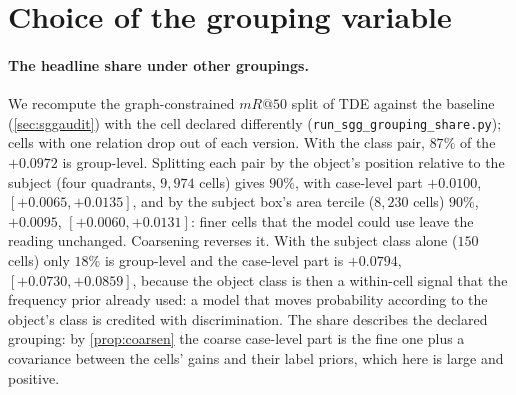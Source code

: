 \section{Choice of the grouping variable}\label{app:partition}

\paragraph{The headline share under other groupings.} We recompute the graph-constrained
$mR@50$ split of TDE against the baseline (\cref{sec:sggaudit}) with the cell declared
differently (\texttt{run\_sgg\_grouping\_share.py}); cells with one relation drop out of each
version. With the class pair, $87\%$ of the $+0.0972$ is group-level. Splitting each pair by the
object's position relative to the subject (four quadrants, $9{,}974$ cells) gives $90\%$, with
case-level part $+0.0100$, $[+0.0065,+0.0135]$, and by the subject box's area tercile
($8{,}230$ cells) $90\%$, $+0.0095$, $[+0.0060,+0.0131]$: finer cells that the model could use
leave the reading unchanged. Coarsening reverses it. With the subject class alone ($150$ cells)
only $18\%$ is group-level and the case-level part is $+0.0794$, $[+0.0730,+0.0859]$, because the
object class is then a within-cell signal that the frequency prior already used: a model that
moves probability according to the object's class is credited with discrimination. The share
describes the declared grouping: by \cref{prop:coarsen} the coarse case-level part is the
fine one plus a covariance between the cells' gains and their label priors, which here is large
and positive.

